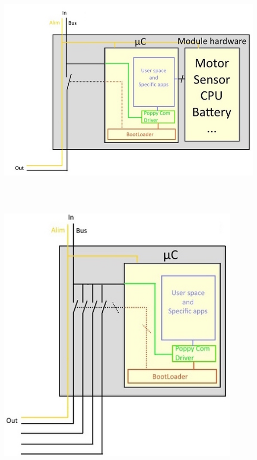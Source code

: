 \documentclass[a0,final, portrait]{inriaposter}
\begin{document}
\begin{multicols}{2}
{%
\begin{center}%
    \includegraphics[height=13cm]{images/modul_arch.jpg}  \hspace{1cm}
    \includegraphics[height=13cm]{images/splitter_arch.jpg}
\end{center}

}
\end{multicols}
\end{document}
